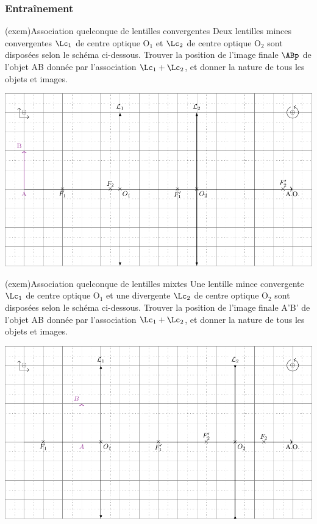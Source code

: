 \documentclass[../../main/main.tex]{subfiles}
\begin{document}
\subsubsection{Entraînement}

\begin{tcb}[label=exem:asso_lent](exem){Association quelconque de lentilles
			convergentes}
	Deux lentilles minces convergentes $\Lc_1$ de centre optique O$_1$ et
	$\Lc_2$ de centre optique O$_2$ sont disposées selon le schéma ci-dessous.
	Trouver la position de l'image finale $\ABp$ de l'objet AB donnée par
	l'association $\Lc_1 + \Lc_2$, et donner la nature de tous les objets et
	images.
	\tcblower
	\begin{center}
		\includegraphics[width=.85\linewidth]{asso_lent-a_plain.pdf}
		\label{fig:asso_lent-conv_plain}
	\end{center}
\end{tcb}
\begin{tcb}[label=exem:asso_lent](exem){Association quelconque de lentilles
			mixtes}
	Une lentille mince convergente $\Lc_1$ de centre optique O$_1$ et une
	divergente $\Lc_2$ de centre optique O$_2$ sont disposées selon le schéma
	ci-dessous. Trouver la position de l'image finale A'B' de l'objet AB
	donnée par l'association $\Lc_1 + \Lc_2$, et donner la nature de tous les
	objets et images.
	\tcblower
	\begin{center}
		\includegraphics[width=.85\linewidth]{asso_lent-b_plain.pdf}
		\label{fig:asso_lent-mix_plain}
	\end{center}
\end{tcb}
\end{document}
